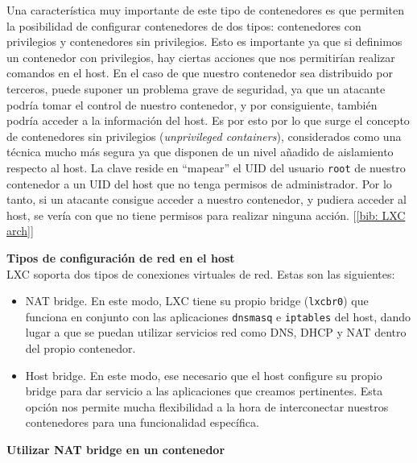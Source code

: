\documentclass[12pt]{article}
\begin{document}
	\noindent Una característica muy importante de este tipo de contenedores es que permiten la posibilidad de configurar contenedores de dos tipos: contenedores con privilegios y contenedores sin privilegios. Esto es importante ya que si definimos un contenedor con privilegios, hay ciertas acciones que nos permitirían realizar comandos en el host. En el caso de que nuestro contenedor sea distribuido por terceros, puede suponer un problema grave de seguridad, ya que un atacante podría tomar el control de nuestro contenedor, y por consiguiente, también podría acceder a la información del host. Es por esto por lo que surge el concepto de contenedores sin privilegios (\textit{unprivileged containers}), considerados como una técnica mucho más segura ya que disponen de un nivel añadido de aislamiento respecto al host. La clave reside en ``mapear'' el UID del usuario \texttt{root} de nuestro contenedor a un UID del host que no tenga permisos de administrador. Por lo tanto, si un atacante consigue acceder a nuestro contenedor, y pudiera acceder al host, se vería con que no tiene permisos para realizar ninguna acción. [\ref{bib: LXC arch}]
	
	\pagebreak
	
	\noindent \textbf{\large Tipos de configuración de red en el host}\\
	
	\noindent LXC soporta dos tipos de conexiones virtuales de red. Estas son las siguientes: 
	\begin{itemize}
		\item NAT bridge. En este modo, LXC tiene su propio bridge (\texttt{lxcbr0}) que funciona en conjunto con las aplicaciones \texttt{dnsmasq} e \texttt{iptables} del host, dando lugar a que se puedan utilizar servicios red como DNS, DHCP y NAT dentro del propio contenedor.
		\item Host bridge. En este modo, ese necesario que el host configure su propio bridge para dar servicio a las aplicaciones que creamos pertinentes. Esta opción nos permite mucha flexibilidad a la hora de interconectar nuestros contenedores para una funcionalidad específica.
	\end{itemize}


	\vspace{20px}

	\noindent \textbf{\large Utilizar NAT bridge en un contenedor}\\
\end{document}
